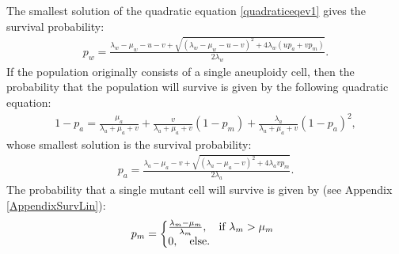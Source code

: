 \documentclass[11pt,a4paper]{article}
\begin{document}
 The smallest solution of the quadratic equation \eqref{quadraticeqev1} gives the survival probability:
\begin{align}\label{survprobw}
p_w=\frac{\lambda_w-\mu_w-u-v+\sqrt{\left(\lambda_w-\mu_w-u-v\right)^2+4\lambda_w\left(up_a+vp_m\right)}}{2\lambda_w}.
\end{align}
If the population originally consists of a single aneuploidy cell, then the probability that the population will survive is given by the following quadratic equation:
\begin{align}
1-p_a=\frac{\mu_a}{\lambda_a+\mu_a+v}+\frac{v}{\lambda_a+\mu_a+v}\left(1-p_m\right)+\frac{\lambda_a}{\lambda_a+\mu_a+v}\left(1-p_a\right)^2,
\end{align}
whose smallest solution is the survival probability:
\begin{align}\label{survproba}
p_a=\frac{\lambda_a-\mu_a-v+\sqrt{\left(\lambda_a-\mu_a-v\right)^2+4\lambda_avp_m}}{2\lambda_a}.
\end{align}
The probability that a single mutant cell will survive is given by (see Appendix \ref{AppendixSurvLin}):
\begin{equation}
p_m=\left\{
  \begin{array}{@{}ll@{}}
  \frac{\lambda_m-\mu_m}{\lambda_m},\quad\text{if }\lambda_m>\mu_m \\
   0,\quad\text{else}.
  \end{array}\right.
  \end{equation}
\end{document}
